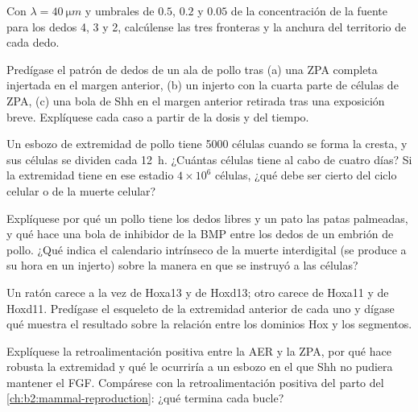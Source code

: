 \begin{exercise}[$\star\star$]\label{exo:b2:limb-organogenesis:5}
Con $\lambda = \qty{40}{\micro m}$ y umbrales de $0.5$, $0.2$
y $0.05$ de la concentración de la fuente para los dedos 4, 3 y 2,
calcúlense las tres fronteras y la anchura del territorio de cada dedo.
\end{exercise}

\begin{exercise}[$\star\star$]\label{exo:b2:limb-organogenesis:6}
Predígase el patrón de dedos de un ala de pollo tras (a) una ZPA completa
injertada en el margen anterior, (b) un injerto con la cuarta parte de
células de ZPA, (c) una bola de Shh en el margen anterior retirada tras
una exposición breve. Explíquese cada caso a partir de la dosis y del
tiempo.
\end{exercise}

\begin{exercise}[$\star\star$]\label{exo:b2:limb-organogenesis:7}
Un esbozo de extremidad de pollo tiene \num{5000} células cuando se forma
la cresta, y sus células se dividen cada \qty{12}{h}. ¿Cuántas células
tiene al cabo de cuatro días? Si la extremidad tiene en ese estadio
$4\times 10^{6}$ células, ¿qué debe ser cierto del ciclo celular o de la
muerte celular?
\end{exercise}

\begin{exercise}[$\star\star$]\label{exo:b2:limb-organogenesis:8}
Explíquese por qué un pollo tiene los dedos libres y un pato las patas
palmeadas, y qué hace una bola de inhibidor de la BMP entre los dedos de
un embrión de pollo. ¿Qué indica el calendario intrínseco de la muerte
interdigital (se produce a su hora en un injerto) sobre la manera en que
se instruyó a las células?
\end{exercise}

\begin{exercise}[$\star\star$]\label{exo:b2:limb-organogenesis:9}
Un ratón carece a la vez de Hoxa13 y de Hoxd13; otro carece de Hoxa11 y
de Hoxd11. Predígase el esqueleto de la extremidad anterior de cada uno y
dígase qué muestra el resultado sobre la relación entre los dominios Hox y
los segmentos.
\end{exercise}

\begin{exercise}[$\star\star\star$]\label{exo:b2:limb-organogenesis:10}
Explíquese la retroalimentación positiva entre la AER y la ZPA, por qué
hace robusta la extremidad y qué le ocurriría a un esbozo en el que Shh no
pudiera mantener el FGF. Compárese con la retroalimentación positiva del
parto del \cref{ch:b2:mammal-reproduction}: ¿qué termina cada bucle?
\end{exercise}

